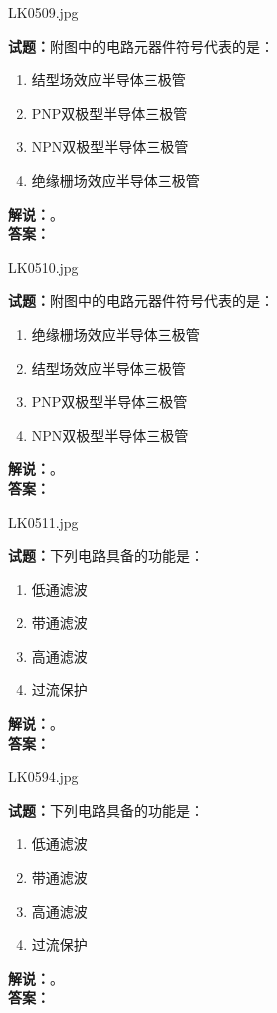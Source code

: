 \documentclass{ctexbook}
\begin{document}
\bigskip

LK0509.jpg

\noindent\textbf{试题：}附图中的电路元器件符号代表的是：
\begin{enumerate}[leftmargin=3em]
  \item 结型场效应半导体三极管
  \item PNP双极型半导体三极管
  \item NPN双极型半导体三极管
  \item 绝缘栅场效应半导体三极管
\end{enumerate}
\noindent\textbf{解说：}\textbf{}。\\\noindent\textbf{答案：}

\bigskip

LK0510.jpg

\noindent\textbf{试题：}附图中的电路元器件符号代表的是：
\begin{enumerate}[leftmargin=3em]
  \item 绝缘栅场效应半导体三极管
  \item 结型场效应半导体三极管
  \item PNP双极型半导体三极管
  \item NPN双极型半导体三极管
\end{enumerate}
\noindent\textbf{解说：}\textbf{}。\\\noindent\textbf{答案：}

\bigskip

LK0511.jpg

\noindent\textbf{试题：}下列电路具备的功能是：
\begin{enumerate}[leftmargin=3em]
  \item 低通滤波
  \item 带通滤波
  \item 高通滤波
  \item 过流保护
\end{enumerate}
\noindent\textbf{解说：}\textbf{}。\\\noindent\textbf{答案：}

\bigskip

LK0594.jpg

\noindent\textbf{试题：}下列电路具备的功能是：
\begin{enumerate}[leftmargin=3em]
  \item 低通滤波
  \item 带通滤波
  \item 高通滤波
  \item 过流保护
\end{enumerate}
\noindent\textbf{解说：}\textbf{}。\\\noindent\textbf{答案：}
\end{document}
